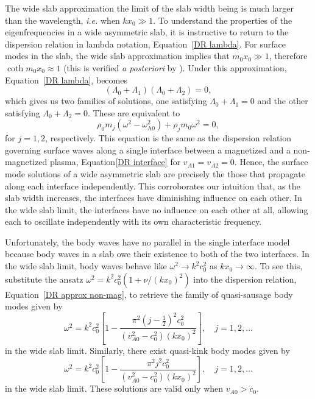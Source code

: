 The wide slab approximation the limit of the slab width being is much larger than the wavelength, \textit{i.e.} when $kx_0 \gg 1$. To understand the properties of the eigenfrequencies in a wide asymmetric slab, it is instructive to return to the dispersion relation in lambda notation, Equation~\eqref{DR lambda}. For surface modes in the slab, the wide slab approximation implies that $m_0x_0 \gg 1$, therefore $\coth{m_0x_0} \approx 1$ (this is verified \textit{a posteriori} by \citealp{rob81b}). Under this approximation, Equation~\eqref{DR lambda}, becomes
\begin{equation}
(\Lambda_0 + \Lambda_1)(\Lambda_0 + \Lambda_2) = 0,
\end{equation}
which gives us two families of solutions, one satisfying $\Lambda_0 + \Lambda_1 = 0$ and the other satisfying $\Lambda_0 + \Lambda_2 = 0$. These are equivalent to
\begin{equation}
	\rho_0m_j(\omega^2 - \omega_\textrm{A0}^2) + \rho_jm_0\omega^2 = 0,
\end{equation}
for $j = 1, 2$, respectively. This equation is the same as the dispersion relation governing surface waves along a single interface between a magnetized and a non-magnetized plasma, Equation\eqref{DR interface} for $v_{A1} = v_{A2} = 0$. Hence, the surface mode solutions of a wide asymmetric slab are precisely the those that propagate along each interface independently. This corroborates our intuition that, as the slab width increases, the interfaces have diminishing influence on each other. In the wide slab limit, the interfaces have no influence on each other at all, allowing each to oscillate independently with its own characteristic frequency.

Unfortunately, the body waves have no parallel in the single interface model because body waves in a slab owe their existence to both of the two interfaces. In the wide slab limit, body waves behave like $\omega^2 \to k^2c_0^2$ as $kx_0 \to \infty$. To see this, substitute the ansatz $\omega^2 = k^2c_0^2 \left(1 + \nu/(kx_0)^2\right)$ into the dispersion relation, Equation~\eqref{DR approx non-mag}, to retrieve the family of quasi-sausage body modes given by
\begin{equation}
\omega^2 = k^2c_0^2\left[1 - \frac{\pi^2(j - \frac{1}{2})^2c_0^2}{(v_{A0}^2 - c_0^2)(kx_0)^2}\right], \quad j = 1, 2, \ldots \label{wide slab saus body}
\end{equation}
in the wide slab limit. Similarly, there exist quasi-kink body modes given by
\begin{equation}
\omega^2 = k^2c_0^2\left[1 - \frac{\pi^2j^2c_0^2}{(v_{A0}^2 - c_0^2)(kx_0)^2}\right], \quad j = 1, 2, \ldots \label{wide slab kink body}
\end{equation}
in the wide slab limit. These solutions are valid only when $v_{A0} > c_0$.

